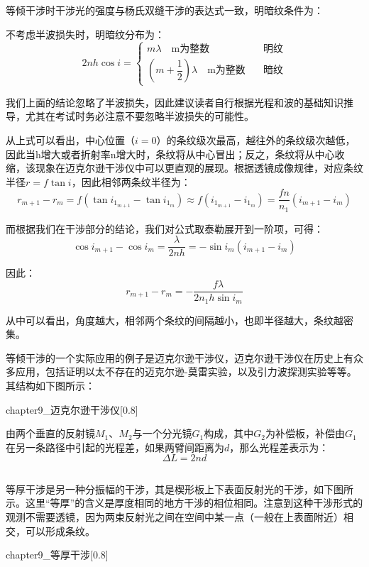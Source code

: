 等倾干涉时干涉光的强度与杨氏双缝干涉的表达式一致，明暗纹条件为：
\begin{law}
    不考虑半波损失时，明暗纹分布为：
    \[2nh\cos i = \begin{cases}
        m\lambda \quad \text{m为整数} & \text{明纹}\\
        (m+\dfrac{1}{2})\lambda \quad \text{m为整数} \quad & \text{暗纹}
    \end{cases}\]
\end{law}

我们上面的结论忽略了半波损失，因此建议读者自行根据光程和波的基础知识推导，尤其在考试时务必注意不要忽略半波损失的可能性。

从上式可以看出，中心位置（$i=0$）的条纹级次最高，越往外的条纹级次越低，因此当h增大或者折射率n增大时，条纹将从中心冒出；反之，条纹将从中心收缩，该现象在迈克尔逊干涉仪中可以更直观的展现。根据透镜成像规律，对应条纹半径$r = f\tan i$，因此相邻两条纹半径为：
\[r_{m+1} - r_m = f(\tan i_{1_{m+1}} - \tan i_{1_m})\approx f(i_{1_{m+1}}-i_{1_m}) = \dfrac{fn}{n_1}(i_{m+1}-i_m)\]

而根据我们在干涉部分的结论，我们对公式取泰勒展开到一阶项，可得：
\[\cos i_{m+1} - \cos i_m = \dfrac{\lambda}{2nh} = -\sin i_m(i_{m+1}-i_m)\]

因此：
\[r_{m+1} - r_m = -\dfrac{f\lambda}{2n_1 h\sin i_m}\]

从中可以看出，角度越大，相邻两个条纹的间隔越小，也即半径越大，条纹越密集。

等倾干涉的一个实际应用的例子是迈克尔逊干涉仪，迈克尔逊干涉仪在历史上有众多应用，包括证明以太不存在的迈克尔逊-莫雷实验，以及引力波探测实验等等。其结构如下图所示：
\begin{singlefigure}[迈克尔逊干涉仪]{chapter9_迈克尔逊干涉仪}[0.8]
\end{singlefigure}

由两个垂直的反射镜$M_1$、$M_2$与一个分光镜$G_1$构成，其中$G_2$为补偿板，补偿由$G_1$在另一条路径中引起的光程差，如果两臂间距离为$d$，那么光程差表示为：
\[\Delta L = 2nd\]
\subsection[等厚干涉]{}
等厚干涉是另一种分振幅的干涉，其是楔形板上下表面反射光的干涉，如下图所示。这里“等厚”的含义是厚度相同的地方干涉的相位相同。注意到这种干涉形式的观测不需要透镜，因为两束反射光之间在空间中某一点（一般在上表面附近）相交，可以形成条纹。
\begin{singlefigure}[等厚干涉]{chapter9_等厚干涉}[0.8]   
\end{singlefigure}

